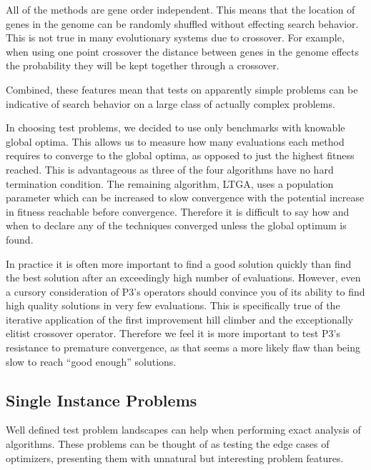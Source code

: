 \documentclass{sig-alternate}
\begin{document}
All of the methods are gene order independent.  This means that the location
of genes in the genome can be randomly shuffled without effecting search behavior.
This is not true in many evolutionary systems due to crossover.  For example,
when using one point crossover the distance between genes in the genome effects the
probability they will be kept together through a crossover.

Combined, these features mean that tests on apparently simple problems can be
indicative of search behavior on a large class of actually complex problems.

In choosing test problems, we decided to use only benchmarks with knowable global
optima.  This allows us to measure how many evaluations each method requires to converge to the
global optima, as opposed to just the highest fitness reached.  This is advantageous
as three of the four algorithms have no hard termination condition.  The remaining
algorithm, LTGA, uses a population parameter which can be increased to slow
convergence with the potential increase in fitness reachable before convergence.
Therefore it is difficult to say how and when to declare any of the techniques
converged unless the global optimum is found.

In practice it is often more important to find a good solution quickly than find
the best solution after an exceedingly high number of evaluations.  However, even
a cursory consideration of P3's operators should convince you of its ability to
find high quality solutions in very few evaluations.  This is specifically true of the iterative
application of the first improvement hill climber and the exceptionally elitist
crossover operator.  Therefore we feel it is more important to test P3's resistance
to premature convergence, as that seems a more likely flaw than being slow to reach
``good enough'' solutions.

\subsection{Single Instance Problems}
Well defined test problem landscapes can help when performing exact analysis of
algorithms.  These problems can be thought of as testing the edge cases of optimizers,
presenting them with unnatural but interesting problem features.
\end{document}
